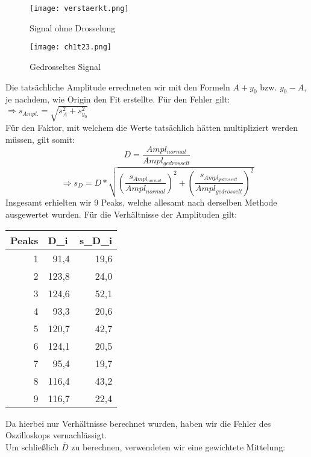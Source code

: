 \begin{figure}[h]
\begin{center}
\texttt{[image: verstaerkt.png]}
\caption{Signal ohne Drosselung}
\end{center}
\end{figure}
\clearpage
\begin{figure}[h]
\begin{center}
\texttt{[image: ch1t23.png]}
\caption{Gedrosseltes Signal}
\end{center}
\end{figure}
Die tatsächliche Amplitude errechneten wir mit den Formeln $A+y_{0}$ bzw. $y_{0}-A$, je nachdem, wie Origin den Fit erstellte. Für den Fehler gilt: \\
$\Rightarrow s_{Ampl.}=\sqrt{s_{A}^{2}+s_{y_{0}}^{2}}$\\
Für den Faktor, mit welchem die Werte tatsächlich hätten multipliziert werden müssen, gilt somit:\\
\[D=\frac{Ampl_{normal}}{Ampl_{gedrosselt}}\]
\[\Rightarrow s_D=D*\sqrt{(\frac{s_{Ampl_{normal}}}{Ampl_{normal}})^{2}+(\frac{s_{Ampl_{gedrosselt}}}{Ampl_{gedrosselt}})^{2}}\]
Insgesamt erhielten wir 9 Peaks, welche allesamt nach derselben Methode ausgewertet wurden. Für die Verhältnisse der Amplituden gilt:\\
\begin{table}[htbp]
\begin{tabular}{|r|r|r|}
\hline
\multicolumn{1}{|l|}{Peaks} & \multicolumn{1}{l|}{D\_i} & \multicolumn{1}{l|}{s\_D\_i} \\ \hline
1 & 91,4 & 19,6 \\ \hline
2 & 123,8 & 24,0 \\ \hline
3 & 124,6 & 52,1 \\ \hline
4 & 93,3 & 20,6 \\ \hline
5 & 120,7 & 42,7 \\ \hline
6 & 124,1 & 20,5 \\ \hline
7 & 95,4 & 19,7 \\ \hline
8 & 116,4 & 43,2 \\ \hline
9 & 116,7 & 22,4 \\ \hline
\end{tabular}
\end{table}
\clearpage
Da hierbei nur Verhältnisse berechnet wurden, haben wir die Fehler des Oszilloskops vernachlässigt.\\
Um schließlich $\bar{D}$ zu berechnen, verwendeten wir eine gewichtete Mittelung:\\
